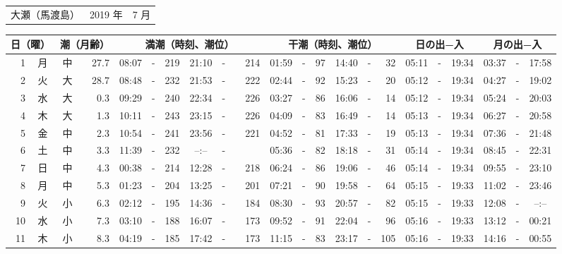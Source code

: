 \documentclass[12pt,a4j]{jsarticle}
\begin{document}
\pagestyle{empty}
 \begin{table}[htbp]
 \begin{center}
 \begin{tabular}{lcc}
 \LARGE{大瀬（馬渡島）}  & \large{2019 年} & \large{ 7 月} \\
 \end{tabular}
 \end{center}
 \begin{center}
         \begin{tabularx}{10cm}{|rc|cr|ccrccr|ccrccr|ccc|ccc|}
    \hline
    \multicolumn{2}{|c|}{日（曜）} & \multicolumn{2}{c|}{潮（月齢）} & \multicolumn{6}{c|}{満潮（時刻、潮位）} & \multicolumn{6}{c|}{干潮（時刻、潮位）} & \multicolumn{3}{c|}{日の出−入} &  \multicolumn{3}{c|}{月の出−入}\\
 \hline
 1 & 月 & 中 & 27.7 &  08:07 &-&219 &  21:10 &-& 214 &  01:59 &-& \hfill97 &  14:40 &-&\hfill32 & 05:11 & -& 19:34 & 03:37 & -& 17:58 \\
 2 & 火 & 大 & 28.7 &  08:48 &-& 232 &  21:53 &-& 222 &  02:44 &-&  92 &  15:23 &-&  20 & 05:12 & -& 19:34 & 04:27 & -& 19:02 \\
 3 & 水 & 大 &  0.3 &  09:29 &-& 240 &  22:34 &-& 226 &  03:27 &-&  86 &  16:06 &-&  14 & 05:12 & -& 19:34 & 05:24 & -& 20:03 \\
 4 & 木 & 大 &  1.3 &  10:11 &-& 243 &  23:15 &-& 226 &  04:09 &-&  83 &  16:49 &-&  14 & 05:13 & -& 19:34 & 06:27 & -& 20:58 \\
 5 & 金 & 中 &  2.3 &  10:54 &-& 241 &  23:56 &-& 221 &  04:52 &-&  81 &  17:33 &-&  19 & 05:13 & -& 19:34 & 07:36 & -& 21:48 \\
 6 & 土 & 中 &  3.3 &  11:39 &-& 232 &  --:-- &-&~~~~~ &  05:36 &-&  82 &  18:18 &-&  31 & 05:14 & -& 19:34 & 08:45 & -& 22:31 \\
 7 & 日 & 中 &  4.3 &  00:38 &-& 214 &  12:28 &-& 218 &  06:24 &-&  86 &  19:06 &-&  46 & 05:14 & -& 19:34 & 09:55 & -& 23:10 \\
 8 & 月 & 中 &  5.3 &  01:23 &-& 204 &  13:25 &-& 201 &  07:21 &-&  90 &  19:58 &-&  64 & 05:15 & -& 19:33 & 11:02 & -& 23:46 \\
 9 & 火 & 小 &  6.3 &  02:12 &-& 195 &  14:36 &-& 184 &  08:30 &-&  93 &  20:57 &-&  82 & 05:15 & -& 19:33 & 12:08 & -& --:-- \\
10 & 水 & 小 &  7.3 &  03:10 &-& 188 &  16:07 &-& 173 &  09:52 &-&  91 &  22:04 &-&  96 & 05:16 & -& 19:33 & 13:12 & -& 00:21 \\
11 & 木 & 小 &  8.3 &  04:19 &-& 185 &  17:42 &-& 173 &  11:15 &-&  83 &  23:17 &-& 105 & 05:16 & -& 19:33 & 14:16 & -& 00:55 \\

\end{tabularx}
\end{center}
\end{table}
\end{document}
